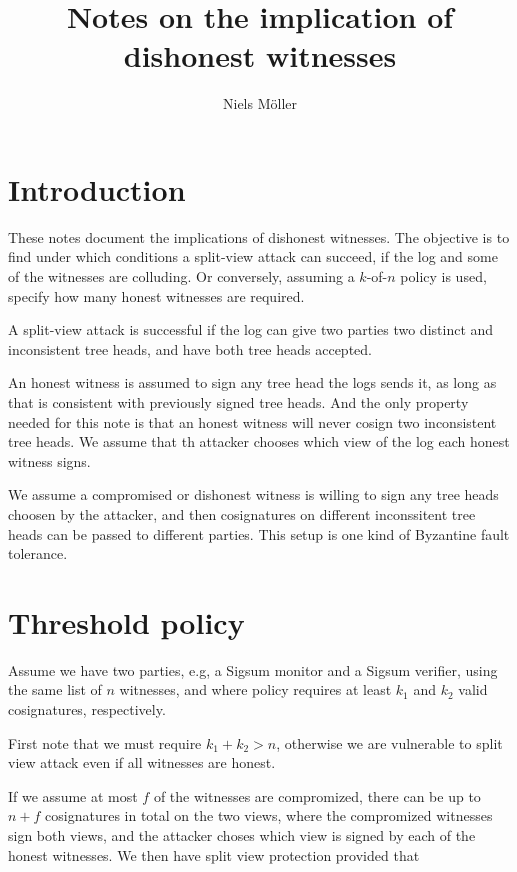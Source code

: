 \documentclass[a4paper]{article}
\author{Niels Möller}
\title{Notes on the implication of dishonest witnesses}
\begin{document}
\maketitle

\section{Introduction}

These notes document the implications of dishonest witnesses. The
objective is to find under which conditions a split-view attack can
succeed, if the log and some of the witnesses are colluding. Or
conversely, assuming a $k$-of-$n$ policy is used, specify how many
honest witnesses are required.

A split-view attack is successful if the log can give two parties two
distinct and inconsistent tree heads, and have both tree heads
accepted.

An honest witness is assumed to sign any tree head the logs sends it,
as long as that is consistent with previously signed tree heads. And
the only property needed for this note is that an honest witness will
never cosign two inconsistent tree heads. We assume that th attacker
chooses which view of the log each honest witness signs.

We assume a compromised or dishonest witness is willing to sign any
tree heads choosen by the attacker, and then cosignatures on different
inconssitent tree heads can be passed to different parties. This setup
is one kind of Byzantine fault tolerance.

\section{Threshold policy}

Assume we have two parties, e.g, a Sigsum monitor and a Sigsum
verifier, using the same list of $n$ witnesses, and where policy
requires at least $k_1$ and $k_2$ valid cosignatures, respectively.

First note that we must require $k_1 + k_2 > n$, otherwise we are
vulnerable to split view attack even if all witnesses are honest.

If we assume at most $f$ of the witnesses are compromized, there can
be up to $n + f$ cosignatures in total on the two views, where the
compromized witnesses sign both views, and the attacker choses which
view is signed by each of the honest witnesses. We then have split
view protection provided that
\end{document}
